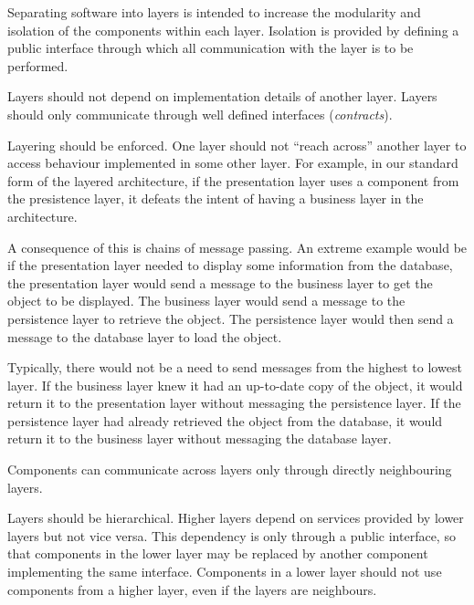 Separating software into layers is intended to increase the modularity and isolation of the components within each layer.
Isolation is provided by defining a public interface through which all communication with the layer is to be performed.

\begin{definition}
    Layers should not depend on implementation details of another layer.
    Layers should only communicate through well defined interfaces (\emph{contracts}).
\end{definition}

Layering should be enforced. One layer should not ``reach across'' another layer to access behaviour implemented in some other layer.
For example, in our standard form of the layered architecture,
if the presentation layer uses a component from the presistence layer, it defeats the intent of having a business layer in the architecture.

A consequence of this is chains of message passing.
An extreme example would be if the presentation layer needed to display some information from the database,
the presentation layer would send a message to the business layer to get the object to be displayed.
The business layer would send a message to the persistence layer to retrieve the object.
The persistence layer would then send a message to the database layer to load the object.

Typically, there would not be a need to send messages from the highest to lowest layer.
If the business layer knew it had an up-to-date copy of the object, it would return it to the presentation layer without messaging the persistence layer.
If the persistence layer had already retrieved the object from the database, it would return it to the business layer without messaging the database layer.

\begin{definition}
    Components can communicate across layers only through directly neighbouring layers.
\end{definition}

Layers should be hierarchical. Higher layers depend on services provided by lower layers but not vice versa.
This dependency is only through a public interface, so that components in the lower layer may be replaced by another component implementing the same interface.
Components in a lower layer should not use components from a higher layer, even if the layers are neighbours.

